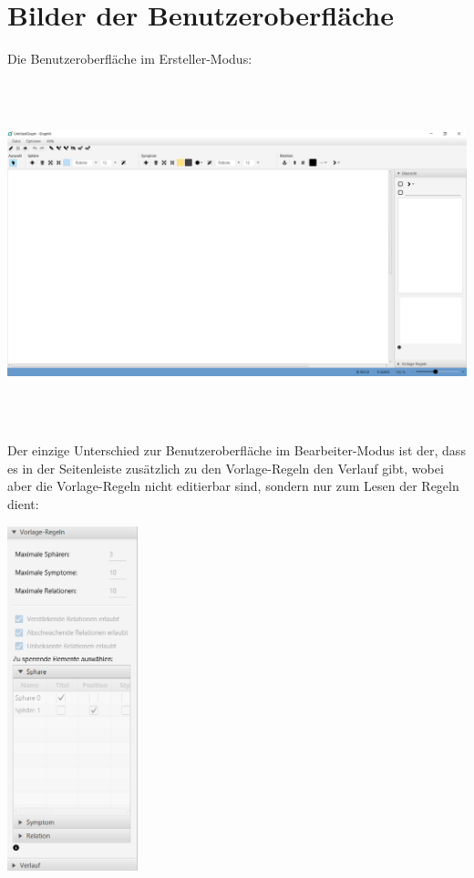 \documentclass[enabledeprecatedfontcommands]{scrartcl}
\begin{document}
\section{Bilder der Benutzeroberfläche}


Die Benutzeroberfläche im Ersteller-Modus:
\begin{center}
	\includegraphics[height=10cm, angle = 90]{erstellerModus.png}
\end{center}
\newpage
Der einzige Unterschied zur Benutzeroberfläche im Bearbeiter-Modus ist der, dass es in der Seitenleiste zusätzlich zu den Vorlage-Regeln den Verlauf gibt,
wobei aber die Vorlage-Regeln nicht editierbar sind, sondern nur zum Lesen der Regeln dient:
\begin{center}
	\includegraphics[height=10cm]{bearbeiterModus.PNG}
\end{center}
\end{document}
